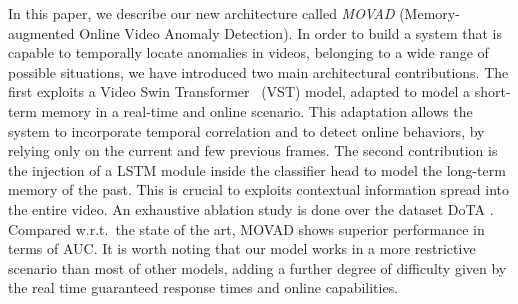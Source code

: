 In this paper, we describe our new architecture called \emph{MOVAD} (Memory-augmented Online Video Anomaly Detection).
In order to build a system that is capable to temporally locate anomalies in videos, belonging to a wide range of possible situations, we have introduced two main architectural contributions.
The first exploits a Video Swin Transformer~\cite{liu_video_2022} (VST) model, adapted to model a short-term memory in a real-time and online scenario.
This adaptation allows the system to incorporate temporal correlation and to detect online behaviors, by relying only on the current and few previous frames.
The second contribution is the injection of a LSTM module inside the classifier head to model the long-term memory of the past.
This is crucial to exploits contextual information spread into the entire video.
An exhaustive ablation study is done over the dataset DoTA \cite{9712446}.
Compared w.r.t.~the state of the art, MOVAD shows superior performance in terms of AUC.
It is worth noting that our model works in a more restrictive scenario than most of other models, adding a further degree of difficulty given by the real time guaranteed response times and online capabilities.